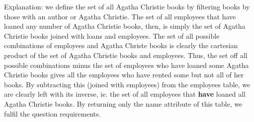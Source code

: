 \documentclass[12pt]{article}
\begin{document}
Explanation: we define the set of all Agatha Christie books by filtering books by those with an author or Agatha Christie. The set of all employees that have loaned any number of Agatha Christie books, then, is simply the set of Agatha Christie books joined with loans and employees. The set of all possible combinations of employees and Agatha Christe books is clearly the cartesian product of the set of Agatha Christie books and employees. Thus, the set off all possible combinations minus the set of employees who have loaned some Agatha Christie books gives all the employees who have rented some but not all of her books. By subtracting this (joined with employees) from the employees table, we are clearly left with its inverse, ie. the set of all employees that {\bf have} loaned all Agatha Christie books. By returning only the name attribute of this table, we fulfil the question requirements.
\end{document}
